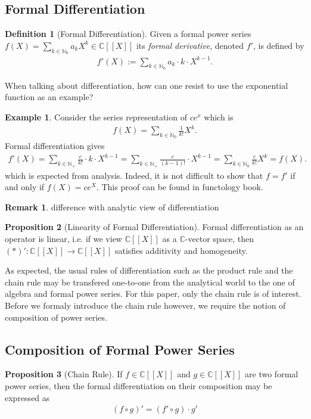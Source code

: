 \documentclass[a4paper]{article}
\theoremstyle{definition}
\newtheorem{definition}{Definition}[]
\newtheorem{example}{Example}[definition]
\newtheorem{proposition}[definition]{Proposition}
\newtheorem*{remark}{Remark}
\begin{document}
\subsection{Formal Differentiation}
\begin{definition}[Formal Differentiation]
    Given a formal power series \(f(X) = \sum_{k \in \mathbb{N}_0} a_k X^k \in \mathbb{C}[[X]]\) its \textit{formal derivative}, denoted \(f'\), is defined by
    \begin{align*}
        f'(X) := \sum_{k \in \mathbb{N}_0} a_k \cdot k \cdot X^{k-1} \text{.}
    \end{align*}
\end{definition}
%
When talking about differentiation, how can one resist to use the exponential function as an example?
%
\begin{example}
    Consider the series representation of \(ce^x\) which is
    \begin{align*}
        f(X) = \sum_{k \in \mathbb{N}_0} \frac{1}{k!} X^k \text{.}
    \end{align*}
    Formal differentiation gives
    \begin{align*}
        f'(X) = \sum_{k \in \mathbb{N}_+} \frac{c}{k!} \cdot k \cdot X^{k-1} = \sum_{k \in \mathbb{N}_+} \frac{c}{(k - 1)!} \cdot X^{k-1} = \sum_{k \in \mathbb{N}_0} \frac{c}{k!} X^k = f(X)\text{.}
    \end{align*}
    which is expected from analysis. Indeed, it is not difficult to show that \(f = f'\) if and only if \(f(X) = ce^X\). This proof can be found in functology book.
\end{example}
%
\begin{remark}
    difference with analytic view of differentiation
\end{remark}
\begin{proposition}[Linearity of Formal Differentiation]
    Formal differentiation as an operator is linear, i.e. if we view \(\mathbb{C}[[X]]\) as a \(\mathbb{C}\)-vector space, then \((\ast)': \mathbb{C}[[X]] \longrightarrow \mathbb{C}[[X]]\) satisfies additivity and homogeneity.
\end{proposition}
As expected, the usual rules of differentiation such as the product rule and the chain rule may be transfered one-to-one from the analytical world to the one of algebra and formal power series. For this paper, only the chain rule is of interest. Before we formaly introduce the chain rule however, we require the notion of composition of power series.
%
\subsection{Composition of Formal Power Series}
\begin{proposition}[Chain Rule]
    If \(f \in \mathbb{C}[[X]]\) and \(g \in \mathbb{C}[[X]]\) are two formal power series, then the formal differentiation on their composition may be expressed as
    \begin{align*}
        (f \circ g)' = (f' \circ g) \cdot g'
    \end{align*}
\end{proposition}
\end{document}

